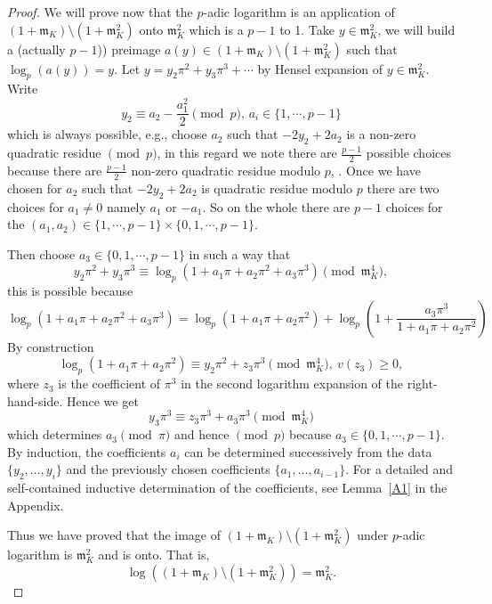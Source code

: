 \documentclass[12pt,reqno]{amsart}
\numberwithin{figure}{section}
\theoremstyle{plain}
\theoremstyle{definition}
\numberwithin{equation}{section}
\begin{document}
\begin{proof}
      We will prove now that the $p$-adic logarithm is an application of $(1+\mathfrak{m}_K) \setminus (1+\mathfrak{m}_K^2)$ onto $\mathfrak{m}_K^2$ which is a $p-1$ to 1. Take $y \in \mathfrak{m}_K^2$, we will build a (actually $p-1$)) preimage $a(y) \in (1+\mathfrak{m}_K) \setminus (1+\mathfrak{m}_K^2)$ such that $\log_p(a(y))=y$. Let $y=y_2 \pi^2+y_3 \pi^3+\cdots$
      by Hensel expansion of $y \in \mathfrak{m}_K^2$. Write
      \[y_2 \equiv a_2-\frac{a_1^2}{2} \pmod{p}, \, a_i \in \{1, \cdots, p-1 \}  \]
      which is always possible, e.g., choose $a_2$ such that $-2y_2+2a_2$ is a non-zero quadratic residue $\pmod{p}$, in this regard we note there are $\frac{p-1}{2}$ possible choices because there are $\frac{p-1}{2}$ non-zero quadratic residue modulo $p$, \cite{GH}. Once we have chosen for $a_2$ such that $-2y_2+2a_2$ is quadratic residue modulo $p$ there are two choices for $a_1 \neq 0$ namely $a_1$ or $-a_1$. So on the whole there are $p-1$ choices for the $(a_1, a_2) \in \{1, \cdots, p-1 \} \times \{0,1, \cdots, p-1\}$.

      Then choose $a_3 \in \{0,1, \cdots, p-1\}$ in such a way that
      \[ y_2 \pi^2+y_3 \pi^3 \equiv \log_p(1+a_1 \pi+a_2 \pi^2+a_3 \pi^3) \pmod{\mathfrak{m}_K^4},  \]
      this is possible because 
      \[\log_p(1+a_1 \pi+a_2 \pi^2+a_3 \pi^3)=\log_p(1+a_1 \pi+a_2 \pi^2)+ \log_p \left(1+\frac{a_3 \pi^3}{1+a_1 \pi+a_2 \pi^2} \right) \]
      By construction
      \[\log_p(1+a_1 \pi+a_2 \pi^2) \equiv y_2 \pi^2+z_3 \pi^3 \pmod{\mathfrak{m}_K^4},~v(z_3) \geq 0, \]
      where $z_3$ is the coefficient of $\pi^3$ in the second logarithm expansion of the right-hand-side.
      Hence we get
      \[y_3 \pi^3 \equiv z_3 \pi^3+a_3 \pi^3 \pmod{\mathfrak{m}_K^4} \]
      which determines $a_3 \pmod{\pi}$ and hence $\pmod{p}$ because $a_3 \in \{0,1, \cdots, p-1 \}$. By induction, the coefficients $a_i$ can be determined successively from the data $\{y_2,\dots,y_i\}$ and the previously chosen coefficients $\{a_1,\dots,a_{i-1}\}$. For a detailed and self-contained inductive determination of the coefficients, see Lemma~\ref{A1} in the Appendix.


      Thus we have proved that the image of $(1+\mathfrak{m}_K) \setminus (1+\mathfrak{m}_K^2)$ under $p$-adic logarithm is $\mathfrak{m}_K^2$ and is onto. That is,
      \[\log\left( (1+\mathfrak{m}_K) \setminus (1+\mathfrak{m}_K^2)  \right)=\mathfrak{m}_K^2. \]
	\end{proof}
\end{document}
